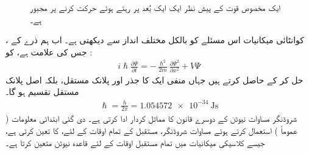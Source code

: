  \begin{figure}
 \centering
 \caption{ایک مخصوص قوت کے پیش نظر ایک  ایک بُعد پر رہتے ہوئے حرکت کرنے پر مجبور ہے۔}
 \label{شکل_تفاعل_موج_حرکت_یک_بعدی}
 \end{figure}
کوانٹائی میکانیات اس مسئلے کو بالکل مختلف انداز سے دیکھتی ہے۔ اب ہم ذرے کے ، جس کی علامت  ہے، کو :
\begin{align}\label{مساوات_تفاعل_موج_شروڈنگر_الف}
 i \hslash \frac{\partial \Psi}{\partial t} = - \frac{\hslash^{2}}{2m} \frac{\partial \Psi^{2}}{\partial x^{2}} + V \Psi
\end{align}
حل کر کے حاصل کرتے ہیں جہاں  منفی ایک  کا جذر اور  پلانک مستقل، بلکہ اصل پلانک مستقل تقسیم  ہو گا۔
\begin{align}
 \hslash = \frac{h}{2\pi} = \SI{1.054572e-34}{\joule\second} 
\end{align}
شروڈنگر مساوات نیوٹن کے دوسرے قانون کا مماثل کردار ادا کرتی ہے۔ دی گئی ابتدائی معلومات ( عموماً  ) استعمال کرتے ہوئے مساوات شروڈنگر، مستقبل کے تمام اوقات کے لئے،  کا تعین کرتی ہے، جیسے کلاسیکی میکانیات میں تمام مستقبل اوقات کے لئے قاعدہ نیوٹن  متعین کرتا ہے۔ 
 

